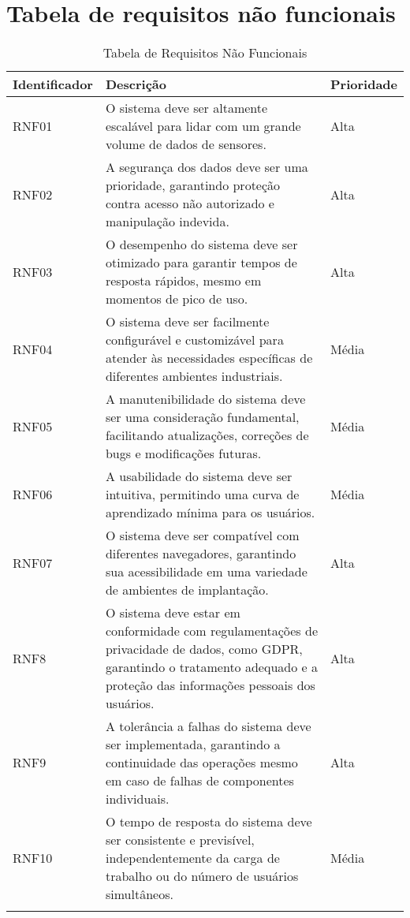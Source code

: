 \section{Tabela de requisitos não funcionais}

\begin{longtable}
{| p{} | p{} | p{} |} 
    \hline
    \textbf{Identificador} & \textbf{Descrição} & \textbf{Prioridade} \\
    \hline
    RNF01 & O sistema deve ser altamente escalável para lidar com um grande volume de dados de sensores. & Alta \\
    \hline
    RNF02 & A segurança dos dados deve ser uma prioridade, garantindo proteção contra acesso não autorizado e manipulação indevida. & Alta \\
    \hline
    RNF03 & O desempenho do sistema deve ser otimizado para garantir tempos de resposta rápidos, mesmo em momentos de pico de uso. & Alta \\
    \hline
    RNF04 & O sistema deve ser facilmente configurável e customizável para atender às necessidades específicas de diferentes ambientes industriais. & Média \\
    \hline
    RNF05 & A manutenibilidade do sistema deve ser uma consideração fundamental, facilitando atualizações, correções de bugs e modificações futuras. & Média \\
    \hline
    RNF06 & A usabilidade do sistema deve ser intuitiva, permitindo uma curva de aprendizado mínima para os usuários. & Média \\
    \hline
    RNF07 & O sistema deve ser compatível com diferentes navegadores, garantindo sua acessibilidade em uma variedade de ambientes de implantação. & Alta \\
    \hline
    RNF8 & O sistema deve estar em conformidade com regulamentações de privacidade de dados, como GDPR, garantindo o tratamento adequado e a proteção das informações pessoais dos usuários. & Alta \\
    \hline
    RNF9 & A tolerância a falhas do sistema deve ser implementada, garantindo a continuidade das operações mesmo em caso de falhas de componentes individuais. & Alta \\
    \hline
    RNF10 & O tempo de resposta do sistema deve ser consistente e previsível, independentemente da carga de trabalho ou do número de usuários simultâneos. & Média \\
    \hline
\caption{Tabela de Requisitos Não Funcionais} %
\label{tab:apendice_req__naofuncionais}
\end{longtable}